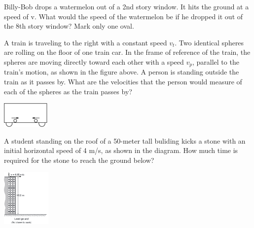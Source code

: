 \documentclass[10pt]{examdesign}
\begin{document}
\begin{multiplechoice} [title={Multiple Choice},
	rearrange=no]
\begin{question}
Billy-Bob drops a watermelon out of a 2nd story window. It hits the ground at a speed of v. What would the speed of the watermelon be if he dropped it out of the 8th story window?
Mark only one oval.
\end{question}

\begin{question}
	A train is traveling to the right with a constant speed $v_t$.  Two identical spheres are rolling on the floor of one train car.  In the frame of reference of the train, the spheres are moving directly toward each other with a speed $v_p$, parallel to the train's motion, as shown in the figure above.  A person is standing outside the train as it passes by.  What are the velocities that the person would measure of each of the spheres as the train passes by? 
	
	\begin{center}
		\includegraphics[height=0.5in]{train2.png}  
	\end{center}
	
	
	
	
\end{question}

\begin{question}
	A student standing on the roof of a 50-meter tall buliding kicks a stone with an initial horizontal speed of 4 m/s, as shown in the diagram.  How much time is required for the stone to reach the ground below? 
	
	\vspace{-1in} \hspace{2 in} \includegraphics[height=1.1in]{building.png}
	

\end{question}
\end{multiplechoice}
\end{document}
